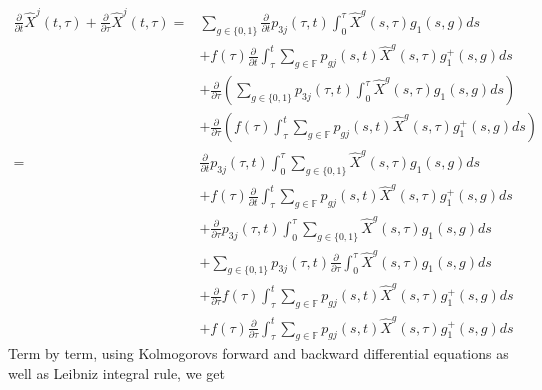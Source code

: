 \documentclass[12pt]{article}
\begin{document}
\begin{align}
\frac{\partial}{\partial t}\hat{X}^j(t,\tau)+ \frac{\partial}{\partial \tau}\hat{X}^j(t,\tau)=
&\sum_{g \in \{0 , 1\}}  
\frac{\partial}{\partial t} p_{3j}(\tau,t) 
\int_0^{\tau}  \hat{X}^g(s,\tau) g_1(s,g) ds \nonumber \\
&+ f(\tau)  \frac{\partial}{\partial t} \int_{\tau}^t \sum_{g \in \mathbb{F}} 
p_{gj}(s,t) \hat{X}^g(s,\tau) g_1^+(s,g)  ds
\nonumber \\
&+ \frac{\partial}{\partial \tau} \left( \sum_{g \in \{0 , 1\}}  
p_{3j}(\tau,t) 
\int_0^{\tau}  \hat{X}^g(s,\tau) g_1(s,g) ds \right) \nonumber \\
&+
\frac{\partial}{\partial \tau}  \left( f(\tau)  \int_{\tau}^t \sum_{g \in \mathbb{F}} 
p_{gj}(s,t) \hat{X}^g(s,\tau) g_1^+(s,g) ds \right)
\nonumber \\
=&
\label{eq_diff:1}
\frac{\partial}{\partial t} p_{3j}(\tau,t) 
\int_0^{\tau} \sum_{g \in \{0 , 1\}} \hat{X}^g(s,\tau) g_1(s,g) ds \\
&+
\label{eq_diff:2}
f(\tau)  \frac{\partial}{\partial t} \int_{\tau}^t \sum_{g \in \mathbb{F}} 
p_{gj}(s,t) \hat{X}^g(s,\tau) g_1^+(s,g)  ds
\\
&
\label{eq_diff:3}
+  
\frac{\partial}{\partial \tau}  p_{3j}(\tau,t) 
\int_0^{\tau} \sum_{g \in \{0 , 1\}}  \hat{X}^g(s,\tau) g_1(s,g) ds  \\
&
\label{eq_diff:4}
+ \sum_{g \in \{0 , 1\}}  
p_{3j}(\tau,t) 
 \frac{\partial}{\partial \tau} \int_0^{\tau}  \hat{X}^g(s,\tau) g_1(s,g) ds  \\
&
\label{eq_diff:5}
+
\frac{\partial}{\partial \tau}   f(\tau)  \int_{\tau}^t \sum_{g \in \mathbb{F}} 
p_{gj}(s,t) \hat{X}^g(s,\tau) g_1^+(s,g) ds \\
&
\label{eq_diff:6}
+ f(\tau)  \frac{\partial}{\partial \tau} \int_{\tau}^t \sum_{g \in \mathbb{F}} 
p_{gj}(s,t) \hat{X}^g(s,\tau) g_1^+(s,g) ds
\end{align}
Term by term, using Kolmogorovs forward and backward differential equations as well as Leibniz integral rule, we get
\end{document}
